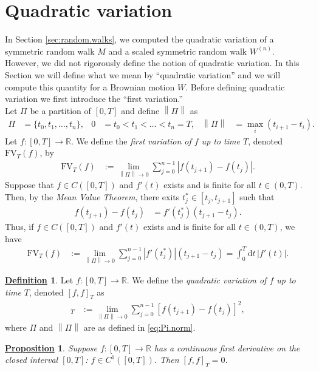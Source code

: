 \documentclass[12pt]{book}
\numberwithin{equation}{chapter}
\theoremstyle{plain}
\numberwithin{theorem}{section}
\newtheorem{proposition}[theorem]{\underline{Proposition}}
\theoremstyle{definition}
\newtheorem{definition}[theorem]{\underline{Definition}}
\numberwithin{exercise}{chapter}
\newcommand{\<}{\langle}
\renewcommand{\>}{\rangle}
\renewcommand{\(}{\left(}
\renewcommand{\)}{\right)}
\renewcommand{\[}{\left[}
\renewcommand{\]}{\right]}
\newcommand\Rb{\mathds{R}}
\newcommand\dd{\mathrm{d}}
\newcommand{\norm}[1]{\left\|#1\right\|}
\begin{document}
\section{Quadratic variation}
\label{sec:QV}
In Section \ref{sec:random.walks}, we computed the quadratic variation of a symmetric random walk $M$ and a scaled symmetric random walk $W^{(n)}$.  However, we did not rigorously define the notion of quadratic variation.  In this Section we will define what we mean by ``quadratic variation'' and we will compute this quantity for a Brownian motion $W$.  Before defining quadratic variation we first introduce the ``first variation.''
\\[0.5em]
Let $\Pi$ be a partition of $[0,T]$ and define $\norm{\Pi}$ as
\begin{align}
\Pi
	&=	\{ t_0 , t_1 , \ldots , t_n \} , &
0
	&= t_0 < t_1 < \ldots < t_n = T , &
\norm{\Pi}
	&=	\max_i ( t_{i+1} - t_i ) .  \label{eq:Pi.norm}
\end{align}
Let $f :[0,T] \to \Rb$.  We define the \emph{first variation of $f$ up to time $T$}, denoted $\text{FV}_T(f)$, by
\begin{align}
\text{FV}_T(f)
	&:=	\lim_{\norm{\Pi} \to 0} \sum_{j=0}^{n-1} | f(t_{j+1}) - f(t_j) | .
\end{align}
Suppose that $f \in C([0,T])$ and $f'(t)$ exists and is finite for all $t \in (0,T)$.  Then, by the \emph{Mean Value Theorem}, there exits $t_j^* \in [t_j,t_{j+1}]$ such that
\begin{align}
f(t_{j+1}) - f(t_j)
	&=	f'(t_j^*) ( t_{j+1} - t_j ) . \label{eq:t.star}
\end{align}
Thus, if $f \in C([0,T])$ and $f'(t)$ exists and is finite for all $t \in (0,T)$, we have
\begin{align}
\text{FV}_T(f)
	&:=	\lim_{\norm{\Pi} \to 0} \sum_{j=0}^{n-1} | f'(t_j^*) | ( t_{j+1} - t_j )
	=		\int_0^T \dd t \, |f'(t)| .
\end{align}

\begin{definition}
\label{def:QV}
Let $f :[0,T] \to \Rb$. We define the \emph{quadratic variation of $f$ up to time $T$}, denoted $[f,f]_T$ as
\begin{align}
[f,f]_T
	&:=	\lim_{\norm{\Pi} \to 0} \sum_{j=0}^{n-1} [ f(t_{j+1}) - f(t_j) ]^2 ,
\end{align}
where $\Pi$ and $\norm{\Pi}$ are as defined in \eqref{eq:Pi.norm}.  
\end{definition}

\begin{proposition}
\label{prp:zero.QV}
Suppose $f:[0,T] \to \Rb$ has a continuous first derivative on the closed interval $[0,T]$: $f \in C^1([0,T])$.  Then $[f,f]_T = 0$.
\end{proposition}
\end{document}
